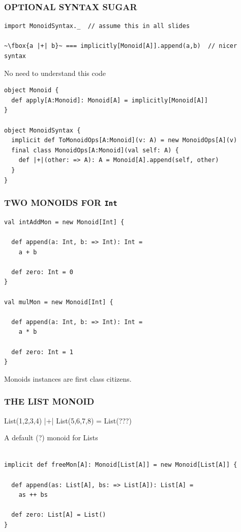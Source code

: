 \documentclass{beamer}
\begin{document}
\begin{frame}[fragile]\frametitle{OPTIONAL SYNTAX SUGAR}
  \begin{block}{}
  \begin{lstlisting}
import MonoidSyntax._  // assume this in all slides

~\fbox{a |+| b}~ === implicitly[Monoid[A]].append(a,b)  // nicer syntax
  \end{lstlisting}
  \end{block}

  \begin{block}{No need to understand this code}
  \begin{lstlisting}
object Monoid {
  def apply[A:Monoid]: Monoid[A] = implicitly[Monoid[A]]
}

object MonoidSyntax {
  implicit def ToMonoidOps[A:Monoid](v: A) = new MonoidOps[A](v)
  final class MonoidOps[A:Monoid](val self: A) {
    def |+|(other: => A): A = Monoid[A].append(self, other)
  }
}
  \end{lstlisting}
  \end{block}
\end{frame}

\begin{frame}[fragile]\frametitle{TWO MONOIDS FOR \texttt{Int}}
  \begin{block}{}
  \begin{lstlisting}
val intAddMon = new Monoid[Int] {

  def append(a: Int, b: => Int): Int =
    a + b

  def zero: Int = 0
}

val mulMon = new Monoid[Int] {

  def append(a: Int, b: => Int): Int =
    a * b

  def zero: Int = 1
}
  \end{lstlisting}
  \end{block}
  Monoids \alert{instances} are first class citizens.
\end{frame}

\begin{frame}[fragile]\frametitle{THE LIST MONOID}
  \begin{block}{}
    List(1,2,3,4) |+| List(5,6,7,8) = List(???)
  \end{block}

  \pause

  \begin{block}{A default (?) monoid for Lists}
  \begin{lstlisting}

implicit def freeMon[A]: Monoid[List[A]] = new Monoid[List[A]] {

  def append(as: List[A], bs: => List[A]): List[A] =
    as ++ bs

  def zero: List[A] = List()
}
  \end{lstlisting}
  \end{block}
\end{frame}
\end{document}
